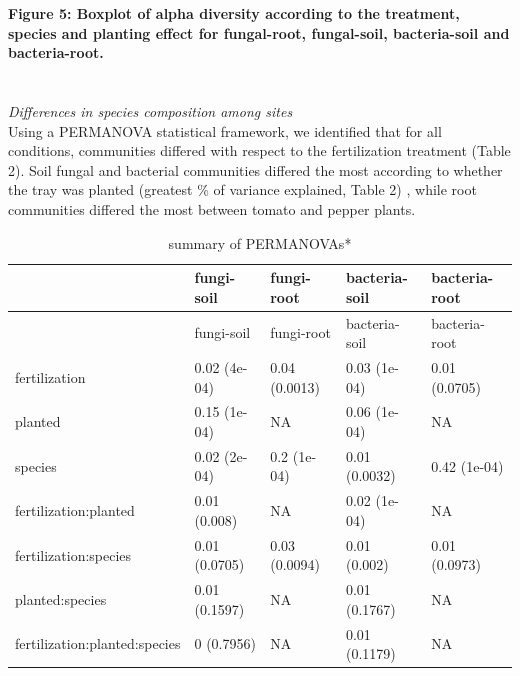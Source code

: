 \documentclass[11pt,]{article}
\begin{document}
\textbf{Figure 5: Boxplot of alpha diversity according to the treatment,
species and planting effect for fungal-root, fungal-soil, bacteria-soil
and bacteria-root.}\\
\hspace*{0.333em}\\
\hspace*{0.333em}\\
\emph{Differences in species composition among sites}\\
Using a PERMANOVA statistical framework, we identified that for all
conditions, communities differed with respect to the fertilization
treatment (Table 2). Soil fungal and bacterial communities differed the
most according to whether the tray was planted (greatest \% of variance
explained, Table 2) , while root communities differed the most between
tomato and pepper plants.

\begin{longtable}[]{@{}lllll@{}}
\caption{summary of PERMANOVAs*}\tabularnewline
\toprule
& fungi-soil & fungi-root & bacteria-soil & bacteria-root\tabularnewline
\midrule
\endfirsthead
\toprule
& fungi-soil & fungi-root & bacteria-soil & bacteria-root\tabularnewline
\midrule
\endhead
fertilization & 0.02 (4e-04) & 0.04 (0.0013) & 0.03 (1e-04) & 0.01
(0.0705)\tabularnewline
planted & 0.15 (1e-04) & NA & 0.06 (1e-04) & NA\tabularnewline
species & 0.02 (2e-04) & 0.2 (1e-04) & 0.01 (0.0032) & 0.42
(1e-04)\tabularnewline
fertilization:planted & 0.01 (0.008) & NA & 0.02 (1e-04) &
NA\tabularnewline
fertilization:species & 0.01 (0.0705) & 0.03 (0.0094) & 0.01 (0.002) &
0.01 (0.0973)\tabularnewline
planted:species & 0.01 (0.1597) & NA & 0.01 (0.1767) & NA\tabularnewline
fertilization:planted:species & 0 (0.7956) & NA & 0.01 (0.1179) &
NA\tabularnewline
\bottomrule
\end{longtable}
\end{document}
